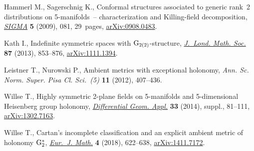 \documentclass[pdftex]{sigma}
\numberwithin{equation}{section}
\begin{document}
\begin{thebibliography}{99}
Hammerl M., Sagerschnig K., Conformal structures associated to generic rank~2
 distributions on 5-mani\-folds~-- characterization and {K}illing-field
 decomposition, \href{https://doi.org/10.3842/SIGMA.2009.081}{\textit{SIGMA}} \textbf{5} (2009), 081, 29~pages,
 \href{https://arxiv.org/abs/0908.0483}{arXiv:0908.0483}.

Kath I., Indefinite symmetric spaces with {$\rm G_{2(2)}$}-structure,
 \href{https://doi.org/10.1112/jlms/jds068}{\textit{J.~Lond. Math. Soc.}} \textbf{87} (2013), 853--876,
 \href{https://arxiv.org/abs/1111.1394}{arXiv:1111.1394}.

Leistner T., Nurowski P., Ambient metrics with exceptional holonomy,
 \textit{Ann. Sc. Norm. Super. Pisa Cl. Sci.~(5)} \textbf{11} (2012),
 407--436.

Willse T., Highly symmetric 2-plane fields on 5-manifolds and 5-dimensional
 {H}eisenberg group holonomy, \href{https://doi.org/10.1016/j.difgeo.2013.10.010}{\textit{Differential Geom. Appl.}} \textbf{33}
 (2014), suppl., 81--111, \href{https://arxiv.org/abs/1302.7163}{arXiv:1302.7163}.

Willse T., Cartan's incomplete classification and an explicit ambient metric of
 holonomy {$\rm G_2^*$}, \href{https://doi.org/10.1007/s40879-017-0178-9}{\textit{Eur.~J. Math.}} \textbf{4} (2018), 622--638,
 \href{https://arxiv.org/abs/1411.7172}{arXiv:1411.7172}.

\end{thebibliography}\LastPageEnding
\end{document}
